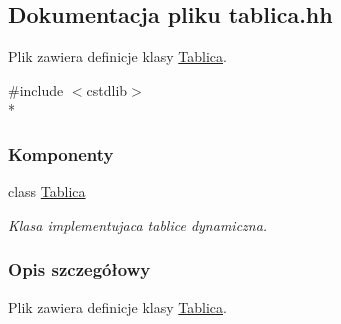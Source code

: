 \hypertarget{tablica_8hh}{\subsection{Dokumentacja pliku tablica.\-hh}
\label{tablica_8hh}
}


Plik zawiera definicje klasy \hyperlink{class_tablica}{Tablica}.  


{\ttfamily \#include $<$cstdlib$>$}\\*
\subsubsection*{Komponenty}
\begin{DoxyCompactItemize}
\item 
class \hyperlink{class_tablica}{Tablica}
\begin{DoxyCompactList}\small\item\em Klasa implementujaca tablice dynamiczna. \end{DoxyCompactList}\end{DoxyCompactItemize}


\subsubsection{Opis szczegółowy}
Plik zawiera definicje klasy \hyperlink{class_tablica}{Tablica}. 
